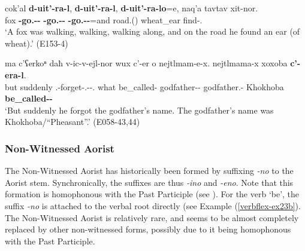 \begin{exe}
	\ex\label{verbflex-ex48}
	\begin{xlist}
		
		
			\ex\label{verbflex-ex48a}
			\gll cok'al \textbf{d-uit'-ra-l}, \textbf{d-uit'-ra-l}, \textbf{d-uit'-ra-lo}=e, naq'a tavtav xit-nor. \\
			fox \textbf{{\D}-go.{\Ipfv}-{\Imprf}-{\Sbjv}} \textbf{{\D}-go.{\Ipfv}-{\Imprf}-{\Sbjv}} \textbf{{\D}-go.{\Ipfv}-{\Imprf}-{\Sbjv}}=and road.{\Obl}({\Ess}) wheat\_ear find-{\Nw}.{\Rem}\\
			\trans `A fox was walking, walking, walking along, and on the road he found an ear (of wheat).'
			\hfill (E153-4)
		
		
		
			\ex\label{verbflex-ex48b}
			\gll ma c'ʕerkoⁿ daħ v-ic-v-ejl-nor wux c'-er o nejtlmam-e-x. nejtlmama-x xoxoba \textbf{c'-era-l}. \\
			but suddenly {\Pv} {\M}.{\Sg}-forget-{\M}.{\Sg}-{\Intr}-{\Nw}.{\Rem} what be\_called-{\Imprf} {\Dist} godfather-{\Obl}-{\Cont} godfather.{\Obl}-{\Cont} Khokhoba \textbf{be\_called-{\Imprf}-{\Sbjv}} \\
			\trans `But suddenly he forgot the godfather's name. The godfather's name was Khokhoba/``Pheasant''.'
			\hfill (E058-43,44)
		
		
	\end{xlist}
\end{exe}


\subsubsection{Non-Witnessed Aorist} 

The Non-Witnessed Aorist has historically been formed by suffixing \textit{-no} to the Aorist stem. Synchronically, the suffixes are thus \textit{-ino} and \textit{-eno}. Note that this formation is homophonous with the Past Participle (see ). For the verb `be', the suffix \textit{-no} is attached to the verbal root directly (see Example (\ref{verbflex-ex23b}). The Non-Witnessed Aorist is relatively rare, and seems to be almost completely replaced by other non-witnessed forms, possibly due to it being homophonous with the Past Participle.

